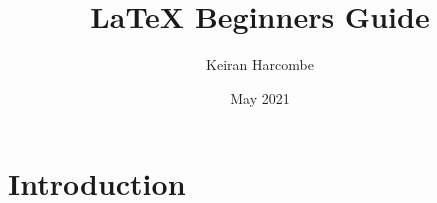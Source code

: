 \documentclass{article}
\title{LaTeX Beginners Guide}
\author{Keiran Harcombe}
\date{May 2021}
\begin{document}
\maketitle

\section{Introduction}
\end{document}
